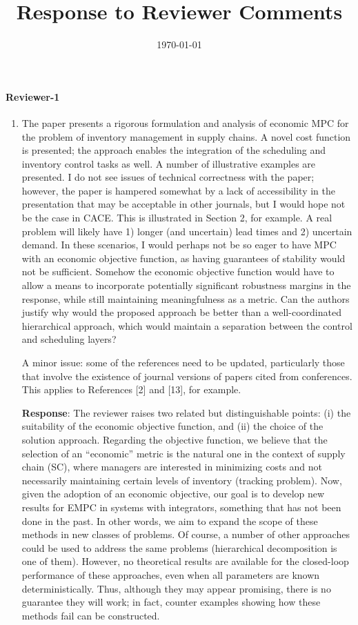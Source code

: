\documentclass{article}
\title{Response to Reviewer Comments}
\date{\today}
\newcommand{\response}[1]{\textbf{Response}: #1}
\begin{document}
\maketitle

\paragraph{Reviewer-1}

\begin{enumerate}
\item
The paper presents a rigorous formulation and analysis of economic MPC
for the problem of inventory management in supply chains. A novel cost
function is presented;  the approach enables the integration of the
scheduling and inventory control tasks as well.  A number of
illustrative examples are presented. I do not see issues of technical
correctness with the paper; however, the paper is hampered somewhat by
a lack of accessibility in the presentation that may be acceptable in
other journals, but I would hope not be the case in CACE.  This is
illustrated in Section 2, for example. 
A real problem will likely have 1) longer (and uncertain) lead times and 2) uncertain demand.
In these scenarios, I would perhaps not be so eager to have MPC with an economic objective 
function, as having guarantees of stability would not be sufficient. Somehow the economic 
objective function would have to allow a means to incorporate potentially significant robustness 
margins in the response, while still maintaining meaningfulness as a metric. Can the authors 
justify why would the proposed approach be better than a well-coordinated hierarchical 
approach, which would maintain a separation between the control and
scheduling layers?


A minor issue: some of the references need to be updated, particularly
those that involve the existence of journal versions of papers cited
from conferences.  This applies to References [2] and [13], for
example. 
 

\response{The reviewer raises two related but distinguishable points: (i) the suitability of the 
economic objective function, and (ii) the choice of the solution approach. Regarding the 
objective function, we believe that the selection of an “economic” metric is the natural one in 
the context of supply chain (SC), where managers are interested in minimizing costs and not 
necessarily maintaining certain levels of inventory (tracking problem). Now, given the adoption 
of an economic objective, our goal is to develop new results for EMPC in systems with 
integrators, something that has not been done in the past. In other words, we aim to expand 
the scope of these methods in new classes of problems. Of course, a number of other 
approaches could be used to address the same problems (hierarchical decomposition is one of 
them). However, no theoretical results are available for the closed-loop performance of these 
approaches, even when all parameters are known deterministically. Thus, although they may 
appear promising, there is no guarantee they will work; in fact, counter examples showing how 
these methods fail can be constructed.

}
\end{enumerate}
\end{document}

